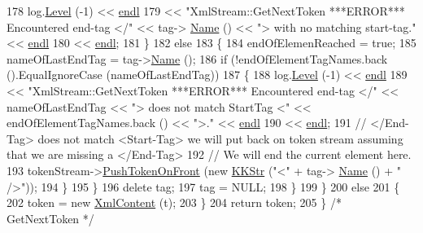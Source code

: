\begin{DoxyCode}
178         log.\hyperlink{class_k_k_b_1_1_run_log_a32cf761d7f2e747465fd80533fdbb659}{Level} (-1) << \hyperlink{namespace_k_k_b_ad1f50f65af6adc8fa9e6f62d007818a8}{endl}
179             << \textcolor{stringliteral}{"XmlStream::GetNextToken   ***ERROR***   Encountered end-tag </"} << tag->
      \hyperlink{class_k_k_b_1_1_xml_tag_a80934a69d86c1e06b13889fcde99a63b}{Name} () << \textcolor{stringliteral}{">  with no matching start-tag."} << \hyperlink{namespace_k_k_b_ad1f50f65af6adc8fa9e6f62d007818a8}{endl}
180             << \hyperlink{namespace_k_k_b_ad1f50f65af6adc8fa9e6f62d007818a8}{endl};
181       \}
182       \textcolor{keywordflow}{else}
183       \{
184         endOfElemenReached = \textcolor{keyword}{true};
185         nameOfLastEndTag = tag->\hyperlink{class_k_k_b_1_1_xml_tag_a80934a69d86c1e06b13889fcde99a63b}{Name} ();
186         \textcolor{keywordflow}{if}  (!endOfElementTagNames.back ().EqualIgnoreCase (nameOfLastEndTag))
187         \{
188           log.\hyperlink{class_k_k_b_1_1_run_log_a32cf761d7f2e747465fd80533fdbb659}{Level} (-1) << \hyperlink{namespace_k_k_b_ad1f50f65af6adc8fa9e6f62d007818a8}{endl}
189             << \textcolor{stringliteral}{"XmlStream::GetNextToken   ***ERROR***   Encountered end-tag </"} << nameOfLastEndTag << \textcolor{stringliteral}{"> 
       does not match StartTag <"} << endOfElementTagNames.back () << \textcolor{stringliteral}{">."} << \hyperlink{namespace_k_k_b_ad1f50f65af6adc8fa9e6f62d007818a8}{endl}
190             << \hyperlink{namespace_k_k_b_ad1f50f65af6adc8fa9e6f62d007818a8}{endl};
191           \textcolor{comment}{// </End-Tag>  does not match <Start-Tag>  we will put back on token stream assuming that we are
       missing a </End-Tag>}
192           \textcolor{comment}{// We will end the current element here.}
193           tokenStream->\hyperlink{class_k_k_b_1_1_xml_tokenizer_a6cbfa15f710ef5de797b6ac48c0ad57f}{PushTokenOnFront} (\textcolor{keyword}{new} \hyperlink{class_k_k_b_1_1_k_k_str}{KKStr} (\textcolor{stringliteral}{"<"} + tag->
      \hyperlink{class_k_k_b_1_1_xml_tag_a80934a69d86c1e06b13889fcde99a63b}{Name} () + \textcolor{stringliteral}{" />"}));
194         \}
195       \}
196       \textcolor{keyword}{delete}  tag;
197       tag = NULL;
198     \}
199   \}
200   \textcolor{keywordflow}{else}
201   \{
202     token = \textcolor{keyword}{new} \hyperlink{class_k_k_b_1_1_xml_content}{XmlContent} (t);
203   \}
204   \textcolor{keywordflow}{return}  token;
205 \}  \textcolor{comment}{/* GetNextToken */}
\end{DoxyCode}
